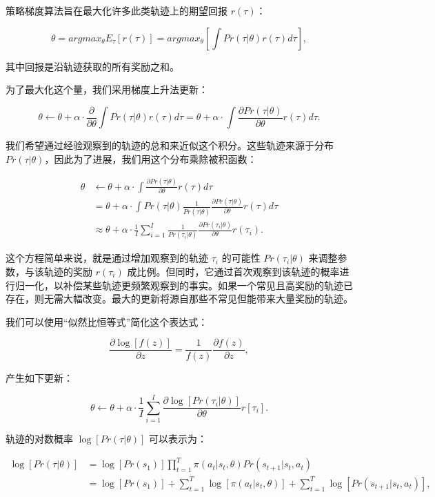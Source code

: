 策略梯度算法旨在最大化许多此类轨迹上的期望回报 \(r(\tau)\)：

\[
\theta = argmax_{\theta} E_{\tau} \left[ r(\tau) \right] = argmax_{\theta} \left[ \int Pr(\tau|\theta)r(\tau) d\tau \right], \tag{19.23}
\]

其中回报是沿轨迹获取的所有奖励之和。

为了最大化这个量，我们采用梯度上升法更新：

\[
\theta \leftarrow \theta + \alpha \cdot \frac{\partial}{\partial \theta} \int Pr(\tau|\theta)r(\tau) d\tau
= \theta + \alpha \cdot \int \frac{\partial Pr(\tau|\theta)}{\partial \theta} r(\tau) d\tau. \tag{19.24}
\]

我们希望通过经验观察到的轨迹的总和来近似这个积分。这些轨迹来源于分布 \(Pr(\tau|\theta)\)，因此为了进展，我们用这个分布乘除被积函数：


\begin{align}
\theta &\leftarrow \theta + \alpha \cdot \int \frac{\partial Pr(\tau|\theta)}{\partial \theta} r(\tau) d\tau \\
&= \theta + \alpha \cdot \int Pr(\tau|\theta) \frac{1}{Pr(\tau|\theta)} \frac{\partial Pr(\tau|\theta)}{\partial \theta} r(\tau) d\tau \\
&\approx \theta + \alpha \cdot \frac{1}{I} \sum_{i=1}^I \frac{1}{Pr(\tau_i|\theta)} \frac{\partial Pr(\tau_i|\theta)}{\partial \theta} r(\tau_i). \tag{19.25}
\end{align} 



这个方程简单来说，就是通过增加观察到的轨迹 \(\tau_i\) 的可能性 \(Pr(\tau_i|\theta)\) 来调整参数，与该轨迹的奖励 \(r(\tau_i)\) 成比例。但同时，它通过首次观察到该轨迹的概率进行归一化，以补偿某些轨迹更频繁观察到的事实。如果一个常见且高奖励的轨迹已存在，则无需大幅改变。最大的更新将源自那些不常见但能带来大量奖励的轨迹。

我们可以使用“似然比恒等式”简化这个表达式：

\[
\frac{\partial \log[f(z)]}{\partial z} = \frac{1}{f(z)} \frac{\partial f(z)}{\partial z}, \tag{19.26}
\]

产生如下更新：

\[
\theta \leftarrow \theta + \alpha \cdot \frac{1}{I} \sum_{i=1}^{I} \frac{\partial \log [Pr(\tau_i|\theta)]}{\partial \theta} r[\tau_i]. \tag{19.27}
\]

轨迹的对数概率 \(\log[Pr(\tau|\theta)]\) 可以表示为：


\begin{align}
\log[Pr(\tau|\theta)] &= \log [Pr(s_1)] \prod_{t=1}^{T} \pi(a_t|s_t, \theta) Pr(s_{t+1}|s_t, a_t) \\
&= \log [Pr(s_1)] + \sum_{t=1}^{T} \log [\pi(a_t|s_t, \theta)] + \sum_{t=1}^{T} \log [Pr(s_{t+1}|s_t, a_t)], \tag{19.28}
\end{align} 


